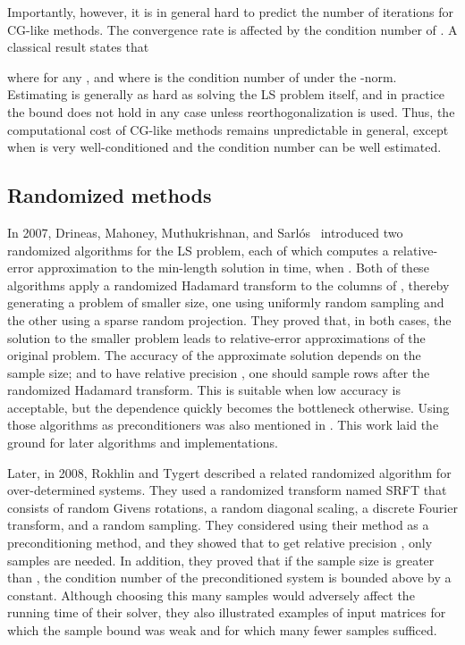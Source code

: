 \documentclass{siamltex}
\begin{document}
Importantly, however, it is in general hard to predict the number of iterations
for CG-like methods.  The convergence rate is affected by the condition number
of .  A classical result \cite[p.187]{luenberger1973introduction} states
that

where  for any ,
and where  is the condition number of  under the -norm.
Estimating  is generally as hard as solving the LS problem
itself, and in practice the bound does not hold in any case unless
reorthogonalization is used.  Thus, the computational cost of CG-like methods
remains unpredictable in general, except when  is very well-conditioned
and the condition number can be well estimated.


\subsection{Randomized methods}




In 2007, Drineas, Mahoney, Muthukrishnan, and
Sarl{\'o}s~\cite{drineas2007faster} introduced two randomized algorithms for the
LS problem, each of which computes a relative-error approximation to the
min-length solution in  time, when .  Both of
these algorithms apply a randomized Hadamard transform to the columns of ,
thereby generating a problem of smaller size, one using uniformly random
sampling and the other using a sparse random projection.  They proved that, in
both cases, the solution to the smaller problem leads to relative-error
approximations of the original problem.  The accuracy of the approximate
solution depends on the sample size; and to have relative precision
, one should sample  rows after the
randomized Hadamard transform.  This is suitable when low accuracy is
acceptable, but the  dependence quickly becomes the bottleneck
otherwise.  Using those algorithms as preconditioners was also mentioned in
\cite{drineas2007faster}. This work laid the ground for later algorithms and
implementations.



Later, in 2008, Rokhlin and Tygert \cite{rokhlin2008fast} described a related
randomized algorithm for over-determined systems.  They used a randomized
transform named SRFT that consists of  random Givens rotations, a random
diagonal scaling, a discrete Fourier transform, and a random sampling.  They
considered using their method as a preconditioning method, and they showed that
to get relative precision , only  samples are needed.  In addition, they proved that if the sample
size is greater than , the condition number of the preconditioned system
is bounded above by a constant.  Although choosing this many samples would
adversely affect the running time of their solver, they also illustrated
examples of input matrices for which the  sample bound was weak and for
which many fewer samples sufficed.
\end{document}
